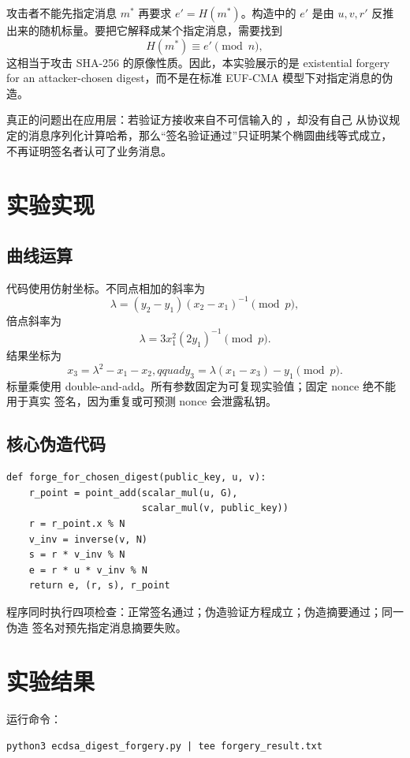\documentclass[UTF8,a4paper,12pt]{ctexart}
\newcommand{\code}[1]{\texttt{\detokenize{#1}}}
\begin{document}
攻击者不能先指定消息 $m^*$ 再要求 $e'=H(m^*)$。构造中的 $e'$ 是由 $u,v,r'$
反推出来的随机标量。要把它解释成某个指定消息，需要找到
\[
H(m^*)\equiv e'\pmod n,
\]
这相当于攻击 SHA-256 的原像性质。因此，本实验展示的是 existential forgery for an
attacker-chosen digest，而不是在标准 EUF-CMA 模型下对指定消息的伪造。

真正的问题出在应用层：若验证方接收来自不可信输入的 \code{msghash32}，却没有自己
从协议规定的消息序列化计算哈希，那么“签名验证通过”只证明某个椭圆曲线等式成立，
不再证明签名者认可了业务消息。

\section{实验实现}

\subsection{曲线运算}

代码使用仿射坐标。不同点相加的斜率为
\[
 \lambda=(y_2-y_1)(x_2-x_1)^{-1}\pmod p,
\]
倍点斜率为
\[
 \lambda=3x_1^2(2y_1)^{-1}\pmod p.
\]
结果坐标为
\[
x_3=\lambda^2-x_1-x_2,qquad
y_3=\lambda(x_1-x_3)-y_1\pmod p.
\]
标量乘使用 double-and-add。所有参数固定为可复现实验值；固定 nonce 绝不能用于真实
签名，因为重复或可预测 nonce 会泄露私钥。

\subsection{核心伪造代码}

\begin{lstlisting}[style=python]
def forge_for_chosen_digest(public_key, u, v):
    r_point = point_add(scalar_mul(u, G),
                        scalar_mul(v, public_key))
    r = r_point.x % N
    v_inv = inverse(v, N)
    s = r * v_inv % N
    e = r * u * v_inv % N
    return e, (r, s), r_point
\end{lstlisting}

程序同时执行四项检查：正常签名通过；伪造验证方程成立；伪造摘要通过；同一伪造
签名对预先指定消息摘要失败。

\section{实验结果}

运行命令：
\begin{lstlisting}[style=cmd]
python3 ecdsa_digest_forgery.py | tee forgery_result.txt
\end{lstlisting}
\end{document}
